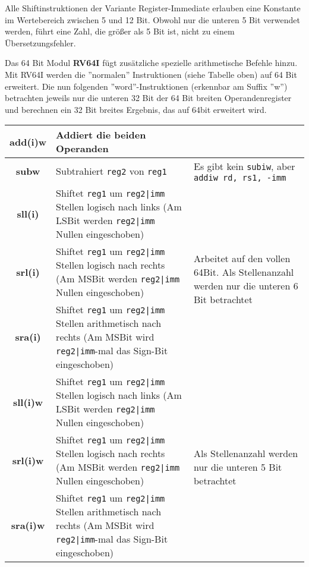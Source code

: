 {\begin{warningblock}
	Alle Shiftinstruktionen der Variante Register-Immediate erlauben eine Konstante im Wertebereich zwischen 5 und 12 Bit. Obwohl nur die unteren 5 Bit verwendet werden, führt eine Zahl, die größer als 5 Bit ist, nicht zu einem Übersetzungsfehler.
\end{warningblock}
Das 64 Bit Modul \textbf{RV64I} fügt zusätzliche spezielle arithmetische Befehle hinzu. Mit RV64I werden die ''normalen'' Instruktionen (siehe Tabelle oben) auf 64 Bit erweitert. Die nun folgenden ''word''-Instruktionen (erkennbar am Suffix ''w'') betrachten jeweils nur die unteren 32 Bit der 64 Bit breiten Operandenregister und berechnen ein 32 Bit breites Ergebnis, das auf 64bit erweitert wird.
\begin{tabular}{|c|p{8cm}|p{4cm}|}
	\hline
	\textbf{add(i)w} & Addiert die beiden Operanden & \\
	\hline
	\textbf{subw} & Subtrahiert \texttt{reg2} von \texttt{reg1}& Es gibt kein \texttt{subiw}, aber \texttt{addiw rd, rs1, -imm} \\
	\hline
	\textbf{sll(i)} & Shiftet \texttt{reg1} um \texttt{reg2|imm} Stellen logisch nach links (Am LSBit werden \texttt{reg2|imm} Nullen eingeschoben) & \multirow{3}{4cm}{Arbeitet auf den vollen 64Bit. Als Stellenanzahl werden nur die unteren 6 Bit betrachtet} \\
	\cline{1-2}
	\textbf{srl(i)} & Shiftet \texttt{reg1} um \texttt{reg2|imm} Stellen logisch nach rechts (Am MSBit werden \texttt{reg2|imm} Nullen eingeschoben) & \\
	\cline{1-2}
	\textbf{sra(i)} & Shiftet \texttt{reg1} um \texttt{reg2|imm} Stellen arithmetisch nach rechts (Am MSBit wird \texttt{reg2|imm}-mal das Sign-Bit eingeschoben) & \\
	\hline
	\textbf{sll(i)w} & Shiftet \texttt{reg1} um \texttt{reg2|imm} Stellen logisch nach links (Am LSBit werden \texttt{reg2|imm} Nullen eingeschoben) & \multirow{3}{4cm}{Als Stellenanzahl werden nur die unteren 5 Bit betrachtet} \\
	\cline{1-2}
	\textbf{srl(i)w} & Shiftet \texttt{reg1} um \texttt{reg2|imm} Stellen logisch nach rechts (Am MSBit werden \texttt{reg2|imm} Nullen eingeschoben) & \\
	\cline{1-2}
	\textbf{sra(i)w} & Shiftet \texttt{reg1} um \texttt{reg2|imm} Stellen arithmetisch nach rechts (Am MSBit wird \texttt{reg2|imm}-mal das Sign-Bit eingeschoben) & \\
	\hline
\end{tabular}

}
